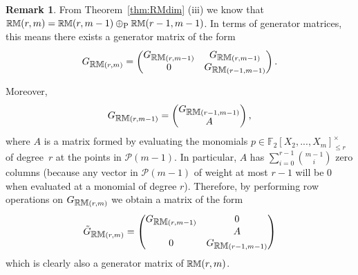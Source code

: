 \documentclass[conference, 10pt]{IEEEtran}
\theoremstyle{plain}
\theoremstyle{definition}
\newtheorem{remark}[definition]{Remark}
\newcommand{\RM}{{\text{\small $\mathbb{RM}$}}}
\newcommand{\numberset}{\mathbb}
\newcommand{\F}{\numberset{F}}
\newcommand{\mP}{\mathcal{P}}
\newcommand{\ps}{\oplus_\textnormal{P}}
\begin{document}
\begin{remark} \label{rem:rmsplit}
From Theorem~\ref{thm:RMdim} (iii) we know that $\RM(r,m) = \RM(r,m-1) \ps \RM(r-1,m-1)$. In terms of generator matrices, this means there exists a generator matrix of the form
\begin{align*}
    G_{\RM(r,m)} = \begin{pmatrix}
        G_{\RM(r,m-1)} & G_{\RM(r,m-1)} \\
        0 & G_{\RM(r-1,m-1)}
    \end{pmatrix}.
\end{align*}

Moreover,
\begin{align*}
    G_{\RM(r,m-1)} = \begin{pmatrix}
        G_{\RM(r-1,m-1)} \\
        A
    \end{pmatrix},
\end{align*}
where $A$ is a matrix formed by evaluating the monomials $p \in \F_2[X_2,...,X_m]_{ \le r}^\times$ of degree~$r$ at the points in $\mP(m-1)$. In particular, $A$ has $\sum_{i=0}^{r-1} \binom{m-1}{i}$ zero columns (because any vector in $\mP(m-1)$ of weight at most $r-1$ will be 0 when evaluated at a monomial of degree $r$). Therefore, by performing row operations on $G_{\RM(r,m)}$ we obtain a matrix of the form
\begin{align} \label{eq:rmm}
    \Tilde{G}_{\RM(r,m)}= \begin{pmatrix}
        G_{\RM(r,m-1)} & 0 \\
         & A \\
       0 & G_{\RM(r-1,m-1)}
    \end{pmatrix}
\end{align}
which is clearly also a generator matrix of $\RM(r,m)$.
\end{remark}

\end{document}
